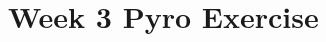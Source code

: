 \newpage
\section{Week 3 Pyro Exercise}
\label{sec:week3:code:pyro}
\inputminted{Python}{../src/week3_pyro.py}

